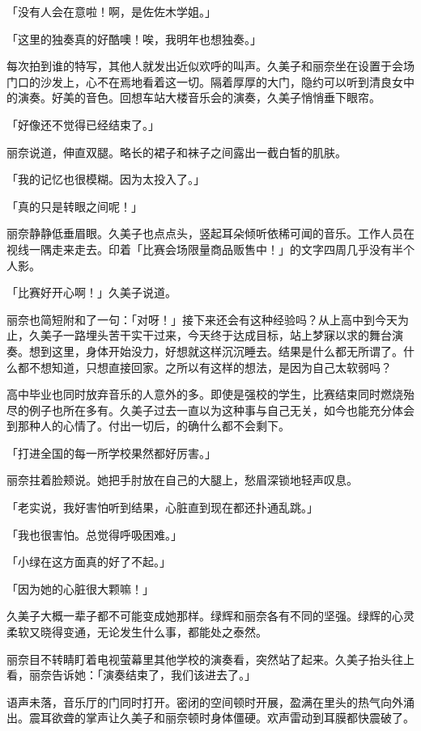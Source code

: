 \documentclass[UTF8]{ctexart}
\begin{document}
    「没有人会在意啦！啊，是佐佐木学姐。」 

    「这里的独奏真的好酷噢！唉，我明年也想独奏。」 

    每次拍到谁的特写，其他人就发出近似欢呼的叫声。久美子和丽奈坐在设置于会场门口的沙发上，心不在焉地看着这一切。隔着厚厚的大门，隐约可以听到清良女中的演奏。好美的音色。回想车站大楼音乐会的演奏，久美子悄悄垂下眼帘。 

    「好像还不觉得已经结束了。」 

    丽奈说道，伸直双腿。略长的裙子和袜子之间露出一截白皙的肌肤。 

    「我的记忆也很模糊。因为太投入了。」 

    「真的只是转眼之间呢！」 

    丽奈静静低垂眉眼。久美子也点点头，竖起耳朵倾听依稀可闻的音乐。工作人员在视线一隅走来走去。印着「比赛会场限量商品贩售中！」的文字四周几乎没有半个人影。 

    「比赛好开心啊！」久美子说道。 

    丽奈也简短附和了一句：「对呀！」接下来还会有这种经验吗？从上高中到今天为止，久美子一路埋头苦干实干过来，今天终于达成目标，站上梦寐以求的舞台演奏。想到这里，身体开始没力，好想就这样沉沉睡去。结果是什么都无所谓了。什么都不想知道，只想直接回家。之所以有这样的想法，是因为自己太软弱吗？ 

    高中毕业也同时放弃音乐的人意外的多。即使是强校的学生，比赛结束同时燃烧殆尽的例子也所在多有。久美子过去一直以为这种事与自己无关，如今也能充分体会到那种人的心情了。付出一切后，的确什么都不会剩下。 

    「打进全国的每一所学校果然都好厉害。」 

    丽奈拄着脸颊说。她把手肘放在自己的大腿上，愁眉深锁地轻声叹息。 

    「老实说，我好害怕听到结果，心脏直到现在都还扑通乱跳。」 

    「我也很害怕。总觉得呼吸困难。」 

    「小绿在这方面真的好了不起。」 

    「因为她的心脏很大颗嘛！」 

    久美子大概一辈子都不可能变成她那样。绿辉和丽奈各有不同的坚强。绿辉的心灵柔软又晓得变通，无论发生什么事，都能处之泰然。 

    丽奈目不转睛盯着电视萤幕里其他学校的演奏看，突然站了起来。久美子抬头往上看，丽奈告诉她：「演奏结束了，我们该进去了。」 

    语声未落，音乐厅的门同时打开。密闭的空间顿时开展，盈满在里头的热气向外涌出。震耳欲聋的掌声让久美子和丽奈顿时身体僵硬。欢声雷动到耳膜都快震破了。 
\end{document}
